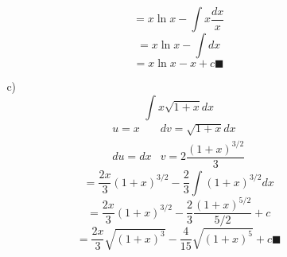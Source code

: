 \documentclass[10pt,twoside]{SelfArx} %
\begin{document}
\begin{enumerate}
\begin{enumerate}
\begin{enumerate}
	 \begin{equation}
	 =x\ln x-\int x\dfrac{dx}{x}
	 \end{equation}
	 \begin{equation}
	 	 =x\ln x-\int dx
	 \end{equation}
	 \begin{equation}
	 	 	 =x\ln x-x+c\blacksquare
	 \end{equation}
	\item[c)] \begin{equation}
	\displaystyle\int x\sqrt{1+x}dx
	\end{equation}
\[ \begin{array}{cc}
u=x & dv=\sqrt{1+x}dx\\
du=dx & v=2\dfrac{(1+x)^{3/2}}{3}
\end{array} \]
\begin{equation}
=\dfrac{2x}{3}(1+x)^{3/2}-\dfrac{2}{3}\int (1+x)^{3/2}dx
\end{equation}
\begin{equation}
=\dfrac{2x}{3}(1+x)^{3/2}-\dfrac{2}{3} \dfrac{(1+x)^{5/2}}{5/2}+c
\end{equation}
\begin{equation}
=\dfrac{2x}{3}\sqrt{(1+x)^{3}}-\dfrac{4}{15} \sqrt{(1+x)^{5}}+c\blacksquare
\end{equation}
\end{enumerate}





\end{enumerate}
\end{enumerate}
\end{document}
